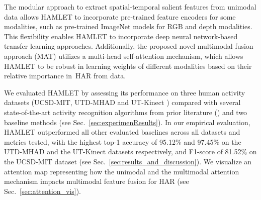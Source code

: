 \documentclass[runningheads]{llncs}
\newcommand{\pa}{HAMLET}
\newcommand{\hattn}{HAT}
\begin{document}
The modular approach to extract spatial-temporal salient features from unimodal data allows {\pa } to incorporate pre-trained feature encoders for some modalities, such as pre-trained ImageNet models for RGB and depth modalities. This flexibility enables {\pa} to incorporate deep neural network-based transfer learning approaches. Additionally, the proposed novel multimodal fusion approach (MAT) utilizes a multi-head self-attention mechanism, which allows {\pa } to be robust in learning weights of different modalities based on their relative importance in~HAR from data.   


We evaluated {\pa } by assessing its performance on three human activity datasets (UCSD-MIT\cite{mit_ucsd}, UTD-MHAD\cite{utd_mhad} and UT-Kinect \cite{ut_kinect}) compared with several state-of-the-art activity recognition algorithms from prior literature (\cite{keyless,mit_ucsd,posemap,sdd_iccv,mcrl,sos,jdm_cnn,dcnn,dmm_mff,utd_mhad}) and two baseline methods (see  Sec.~\ref{sec:experimenResults}).
In our empirical evaluation, {\pa } outperformed all other evaluated baselines across all datasets and metrics tested, with the highest top-1 accuracy of 95.12\% and 97.45\% on the UTD-MHAD \cite{utd_mhad} and the UT-Kinect\cite{ut_kinect} datasets respectively, and F1-score of 81.52\% on the UCSD-MIT \cite{mit_ucsd} dataset (see Sec.~\ref{sec:results_and_discussion}).
We visualize an attention map representing how the unimodal and the multimodal attention mechanism impacts multimodal feature fusion for HAR (see Sec.~\ref{sec:attention_vis}).









\begin{comment}

\par The main contributions of this work are as follows:
\begin{itemize}
    \item We propose a modular multimodal feature learning architecture, {\pa}, where we first introduced modality-based transfer learning by plugging the state-of-the-art pre-trained unimodal feature encoders.
\item We develop a novel multimodal self-attention method, {\hattn}. To the best of our knowledge, we are the first to employ the multi-head self-attention mechanism to disentangle and fuse the unimodal feature objects hierarchically.
    \item In the extensive experimental analysis, our proposed learning method {\pa } showed competitive performance improvement on three heterogeneous multimodal datasets, UTD-MAD\cite{utd_mhad}, UCSD-MIT\cite{mit_ucsd} and UT-Kinect\cite{ut_kinect}.
    \item We also visualize the unimodal and multimodal attention map for analyzing the impact of multimodal attention approach in HAR, which we discussed in Section~\ref{sec:attention_vis}.
\end{itemize}

\end{comment}
\end{document}
